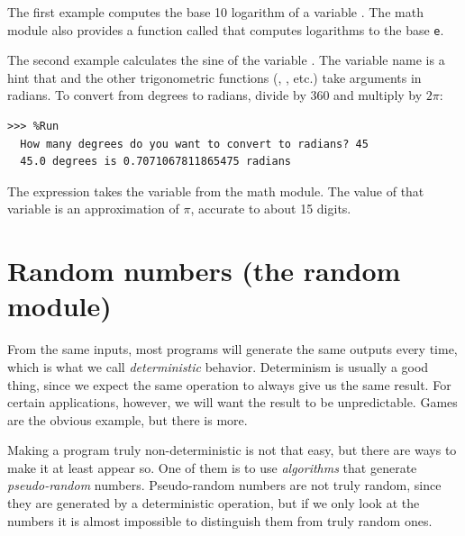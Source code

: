 The first example computes the base 10 logarithm of a variable . The math module also provides a function called  that computes logarithms to the base \texttt{e}.

  
 

The second example calculates the sine of the variable . The variable name is a hint that  and the other trigonometric functions (, , etc.) take arguments in radians. To convert from degrees to radians, divide by 360 and multiply by \(2\pi\):




\begin{Verbatim}[frame=single]
>>> %Run 
  How many degrees do you want to convert to radians? 45
  45.0 degrees is 0.7071067811865475 radians
\end{Verbatim}

The expression  takes the variable  from the math module. The value of that variable is an approximation of \(\pi\), accurate to about 15 digits.


\hypertarget{nuxfameros-aleatorios}{%
\section{Random numbers (the random module)}\label{nuxfameros-aleatorios}}

 
 

From the same inputs, most programs will generate the same outputs every time, which is what we call \emph{deterministic} behavior. Determinism is usually a good thing, since we expect the same operation to always give us the same result. For certain applications, however, we will want the result to be unpredictable. Games are the obvious example, but there is more.

Making a program truly non-deterministic is not that easy, but there are ways to make it at least appear so. One of them is to use \emph{algorithms} that generate \emph{pseudo-random} numbers. Pseudo-random numbers are not truly random, since they are generated by a deterministic operation, but if we only look at the numbers it is almost impossible to distinguish them from truly random ones.

